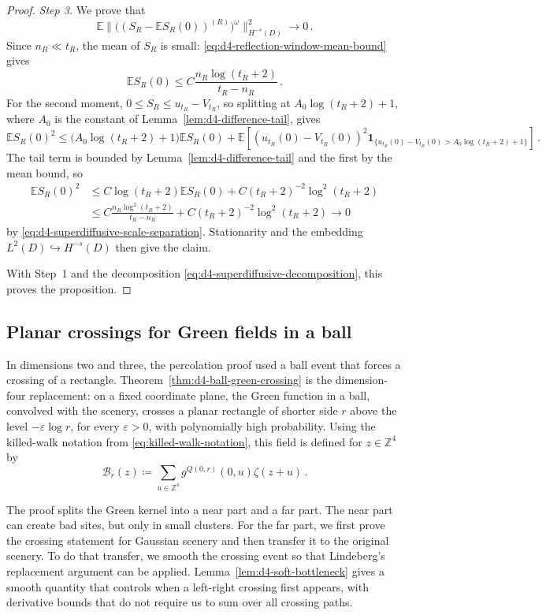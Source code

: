 \documentclass[11pt]{amsart}
\theoremstyle{plain}
\theoremstyle{definition}
\newcommand{\Z}{\mathbb{Z}}
\newcommand{\E}{\mathbb{E}}
\newcommand{\one}{\mathbf{1}}
\begin{document}
\begin{proof}
			\smallskip
			\noindent\emph{Step 3.} We prove that
			\[
				\E\bigl\|\bigl((S_R-\E S_R(0))^{(R)}\bigr)^\omega\bigr\|_{H^{-s}(D)}^2\longrightarrow0\, .
			\]
			Since $n_R\ll t_R$, the mean of $S_R$ is small: \eqref{eq:d4-reflection-window-mean-bound} gives
			\[
				\E S_R(0)\leq C\frac{n_R\log(t_R+2)}{t_R-n_R}\, .
			\]
			For the second moment, $0\leq S_R\leq u_{t_R}-V_{t_R}$, so splitting at $A_0\log(t_R+2)+1$, where $A_0$ is the constant of Lemma~\ref{lem:d4-difference-tail}, gives
			\[
				\E S_R(0)^2
				\leq
				\bigl(A_0\log(t_R+2)+1\bigr)\E S_R(0)
				+\E\left[
				(u_{t_R}(0)-V_{t_R}(0))^2
				\one_{\{u_{t_R}(0)-V_{t_R}(0)>A_0\log(t_R+2)+1\}}
				\right]\, .
			\]
			The tail term is bounded by Lemma~\ref{lem:d4-difference-tail} and the first by the mean bound, so
			\begin{align*}
				\E S_R(0)^2
				&\leq
				C\log(t_R+2)\E S_R(0)
				+C(t_R+2)^{-2}\log^2(t_R+2)\\
				&\leq
				C\frac{n_R\log^2(t_R+2)}{t_R-n_R}
				+C(t_R+2)^{-2}\log^2(t_R+2)
				\longrightarrow0
			\end{align*}
			by \eqref{eq:d4-superdiffusive-scale-separation}. Stationarity and the embedding $L^2(D)\hookrightarrow H^{-s}(D)$ then give the claim.

			With Step~1 and the decomposition \eqref{eq:d4-superdiffusive-decomposition}, this proves the proposition.
		\end{proof}
\subsection{Planar crossings for Green fields in a ball}
\label{ssec:d4-ball-green-crossings}

In dimensions two and three, the percolation proof used a ball event that forces a crossing of a rectangle. Theorem~\ref{thm:d4-ball-green-crossing} is the dimension-four replacement: on a fixed coordinate plane, the Green function in a ball, convolved with the scenery, crosses a planar rectangle of shorter side $r$ above the level $-\varepsilon\log r$, for every $\varepsilon>0$, with polynomially high probability. Using the killed-walk notation from
\eqref{eq:killed-walk-notation}, this field is defined for $z\in\Z^4$ by
\begin{equation}\label{eq:d4-ball-green-field}
	\mathcal B_r(z)\coloneqq
	\sum_{u\in\Z^4}g^{Q(0,r)}(0,u)\zeta(z+u)  \, . 
\end{equation}

The proof splits the Green kernel into a near part and a far part. The near part can create bad sites, but only in small clusters. For the far part, we first prove the crossing statement for Gaussian scenery and then transfer it to the original scenery. To do that transfer, we smooth the crossing event so that Lindeberg's replacement argument can be applied.
Lemma~\ref{lem:d4-soft-bottleneck} gives a smooth quantity that controls when a left-right crossing first appears, with derivative bounds that do not require us to sum over all crossing paths.
\end{document}
